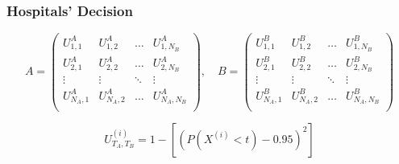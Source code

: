 \begin{frame}
    \frametitle{Hospitals' Decision}
    \centering

    \scriptsize

    \begin{equation*}
        A = 
        \begin{pmatrix}
            U_{1,1}^A & U_{1,2}^A & \dots & U_{1,N_B}^A \\ 
            U_{2,1}^A & U_{2,2}^A & \dots & U_{2,N_B}^A \\
            \vdots & \vdots & \ddots & \vdots \\
            U_{N_A,1}^A & U_{N_A,2}^A & \dots & U_{N_A,N_B}^A \\
        \end{pmatrix}, \quad
        B = 
        \begin{pmatrix}
            U_{1,1}^B & U_{1,2}^B & \dots & U_{1,N_B}^B \\ 
            U_{2,1}^B & U_{2,2}^B & \dots & U_{2,N_B}^B \\
            \vdots & \vdots & \ddots & \vdots \\
            U_{N_A,1}^B & U_{N_A,2}^B & \dots & U_{N_A,N_B}^B \\
        \end{pmatrix}
    \end{equation*}

    \begin{equation*}
        U_{T_A,T_B}^{(i)} = 1 - \left[ (P(X^{(i)} < t) - 0.95)^2 \right]
    \end{equation*}
\end{frame}
